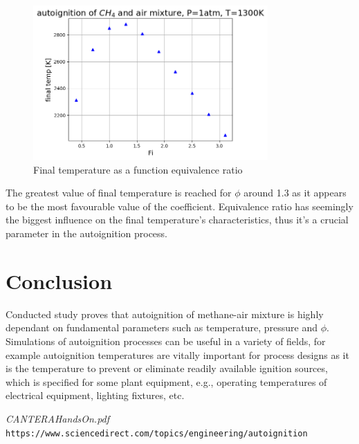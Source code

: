 \documentclass[a4paper]{article}
\begin{document}
\begin{figure}[H]
\centering
\includegraphics[width=0.8\textwidth]{finaltemp_Fi.png}
\caption{Final temperature as a function equivalence ratio}
\end{figure}
The greatest value of final temperature is reached for $\phi$ around 1.3 as it appears to be the most favourable value of the coefficient. Equivalence ratio has seemingly the biggest influence on the final temperature's characteristics, thus it's a crucial parameter in the autoignition process.
\section{Conclusion}
Conducted study proves that autoignition of methane-air mixture is highly dependant on fundamental parameters such as temperature, pressure and $\phi$.\\
Simulations of autoignition processes can be useful in a variety of fields, for example autoignition temperatures are vitally important for process designs as it is the temperature to prevent or eliminate readily available ignition sources, which is specified for some plant equipment, e.g., operating temperatures of electrical equipment, lighting fixtures, etc.

\begin{thebibliography}{9}
\textit{CANTERA\textunderscore HandsOn.pdf}
\texttt{https://www.sciencedirect.com/topics/engineering/autoignition}
\end{thebibliography}
\end{document}
